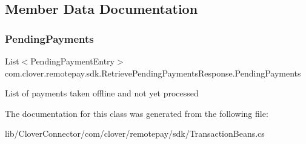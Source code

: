 \subsection{Member Data Documentation}
\mbox{\label{classcom_1_1clover_1_1remotepay_1_1sdk_1_1_retrieve_pending_payments_response_a71ad54fea229a5d583419a8d3db126f3}} 
\subsubsection{\texorpdfstring{Pending\+Payments}{PendingPayments}}
{\footnotesize\ttfamily List$<$Pending\+Payment\+Entry$>$ com.\+clover.\+remotepay.\+sdk.\+Retrieve\+Pending\+Payments\+Response.\+Pending\+Payments}



List of payments taken offline and not yet processed 



The documentation for this class was generated from the following file\+:\begin{DoxyCompactItemize}
\item 
lib/\+Clover\+Connector/com/clover/remotepay/sdk/Transaction\+Beans.\+cs\end{DoxyCompactItemize}
